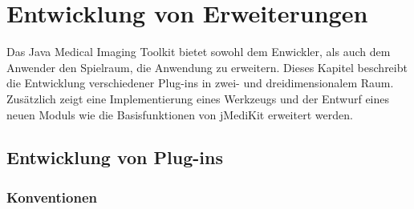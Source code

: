 \chapter{Entwicklung von Erweiterungen} \label{extending}

Das Java Medical Imaging Toolkit bietet sowohl dem Enwickler, als auch dem Anwender den Spielraum, die Anwendung zu erweitern. Dieses Kapitel beschreibt die Entwicklung verschiedener Plug-ins in zwei- und dreidimensionalem Raum. Zusätzlich zeigt eine Implementierung eines Werkzeugs und der Entwurf eines neuen Moduls wie die Basisfunktionen von jMediKit erweitert werden.

\section{Entwicklung von Plug-ins}

\subsection{Konventionen}

